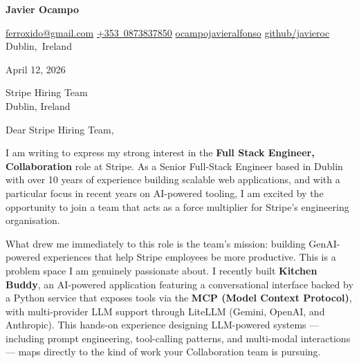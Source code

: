 \documentclass[10pt, letterpaper]{article}
\let\hrefWithoutArrow\href
\renewcommand{\href}[2]{\hrefWithoutArrow{#1}{\ifthenelse{\equal{#2}{}}{ }{#2 }\raisebox{.15ex}{\footnotesize \faExternalLink*}}}
\begin{document}
\begin{center}
    \textbf{\fontsize{24pt}{24pt}\selectfont Javier Ocampo}

    \vspace{0.3cm}
    \normalsize
    \mbox{\hrefWithoutArrow{mailto:ferroxido@gmail.com}{\color{black}{\footnotesize\faEnvelope[regular]}\hspace*{0.13cm}ferroxido@gmail.com}}%
    \quad
    \mbox{\hrefWithoutArrow{tel:+353-873837850}{\color{black}{\footnotesize\faPhone*}\hspace*{0.13cm}+353 0873837850}}%
    \quad
    \mbox{\hrefWithoutArrow{https://www.linkedin.com/in/ocampojavieralfonso}{\color{black}{\footnotesize\faLinkedinIn}\hspace*{0.13cm}ocampojavieralfonso}}%
    \quad
    \mbox{\hrefWithoutArrow{https://github.com/javieroc/}{\color{black}{\footnotesize\faGithub}\hspace*{0.13cm}github/javieroc}}%
    \quad
    \mbox{\color{black}{\footnotesize\faMapMarker*}\hspace*{0.13cm}Dublin, Ireland}%
\end{center}

\vspace{0.3cm}

\noindent April 12, 2026

\vspace{0.3cm}

\noindent Stripe Hiring Team \\
\noindent Dublin, Ireland

\vspace{0.3cm}

\noindent Dear Stripe Hiring Team,

I am writing to express my strong interest in the \textbf{Full Stack Engineer, Collaboration} role at Stripe. As a Senior Full-Stack Engineer based in Dublin with over 10 years of experience building scalable web applications, and with a particular focus in recent years on AI-powered tooling, I am excited by the opportunity to join a team that acts as a force multiplier for Stripe's engineering organisation.

What drew me immediately to this role is the team's mission: building GenAI-powered experiences that help Stripe employees be more productive. This is a problem space I am genuinely passionate about. I recently built \textbf{Kitchen Buddy}, an AI-powered application featuring a conversational interface backed by a Python service that exposes tools via the \textbf{MCP (Model Context Protocol)}, with multi-provider LLM support through LiteLLM (Gemini, OpenAI, and Anthropic). This hands-on experience designing LLM-powered systems — including prompt engineering, tool-calling patterns, and multi-modal interactions — maps directly to the kind of work your Collaboration team is pursuing.
\end{document}
